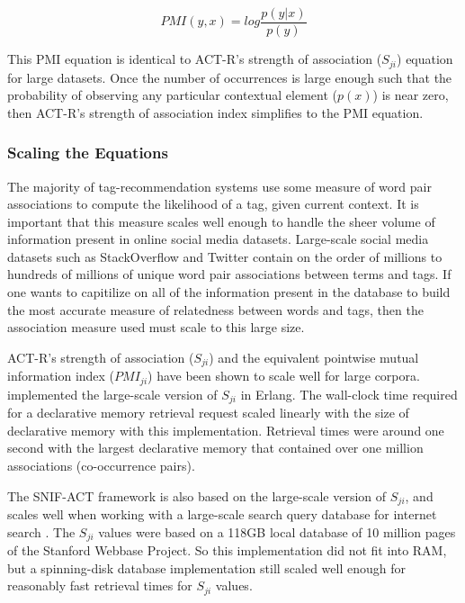 \documentclass[man]{apa6}
\begin{document}
\begin{equation}
  \label{eqPMI}
  \mathit{PMI}(y,x) = log \frac{p(y|x)}{p(y)}
\end{equation}

This PMI equation is identical to ACT-R's strength of association ($S_{ji}$) equation for large datasets.
Once the number of occurrences is large enough such that the probability of observing any particular contextual element ($p(x)$) is near zero, then ACT-R's strength of association index simplifies to the PMI equation.

\subsubsection{Scaling the Equations}

The majority of tag-recommendation systems use some measure of word pair associations to compute the likelihood of a tag, given current context.
It is important that this measure scales well enough to handle the sheer volume of information present in online social media datasets.
Large-scale social media datasets such as StackOverflow and Twitter contain on the order of millions to hundreds of millions of unique word pair associations between terms and tags.
If one wants to capitilize on all of the information present in the database to build the most accurate measure of relatedness between words and tags, then the association measure used must scale to this large size.

ACT-R's strength of association ($S_{ji}$) and the equivalent pointwise mutual information index ($\mathit{PMI}_{ji}$) have been shown to scale well for large corpora.
\textcite{Douglass2010} implemented the large-scale version of $S_{ji}$ in Erlang.
The wall-clock time required for a declarative memory retrieval request scaled linearly with the size of declarative memory with this implementation.
Retrieval times were around one second with the largest declarative memory that contained over one million associations (co-occurrence pairs).

The SNIF-ACT framework is also based on the large-scale version of $S_{ji}$, and scales well when working with a large-scale search query database for internet search \parencites{Fu2007,Pirolli2003}.
The $S_{ji}$ values were based on a 118GB local database of 10 million pages of the Stanford Webbase Project.
So this implementation did not fit into RAM, but a spinning-disk database implementation still scaled well enough for reasonably fast retrieval times for $S_{ji}$ values.
\end{document}
